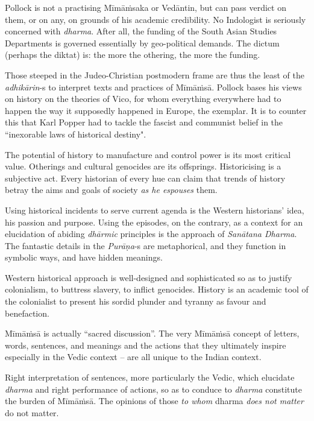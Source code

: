 Pollock is not a practising Mīmāṁsaka or Vedāntin, but can pass verdict on them, or on any, on grounds of his academic credibility. No Indologist is seriously concerned with \textit{dharma}. After all, the funding of the South Asian Studies Departments is governed essentially by geo-political demands. The dictum (perhaps the diktat) is: the more the othering, the more the funding.

 Those steeped in the Judeo-Christian postmodern frame are thus the least of the \textit{adhikārin}-s to interpret texts and practices of Mīmāṁsā. Pollock bases his views on history on the theories of Vico, for whom everything everywhere had to happen the way it supposedly happened in Europe, the exemplar. It is to counter this that Karl Popper had to tackle the fascist and communist belief in the ``inexorable laws of historical destiny".

 The potential of history to manufacture and control power is its most critical value. Otherings and cultural genocides are its offsprings. Historicising is a subjective act. Every historian of every hue can claim that trends of history betray the aims and goals of society \textit{as he espouses} them.

Using historical incidents to serve current agenda is the Western historians’ idea, his passion and purpose. Using the episodes, on the contrary, as a context for an elucidation of abiding \textit{dhārmic} principles is the approach of \textit{Sanātana Dharma}. The fantastic details in the \hbox{\textit{Purāṇa}-s} are metaphorical, and they function in symbolic ways, and have hidden meanings.

Western historical approach is well-designed and sophisticated so as to justify colonialism, to buttress slavery, to inflict genocides. History is an academic tool of the colonialist to present his sordid plunder and tyranny as favour and benefaction.

Mīmāṁsā is actually “sacred discussion”. The very Mīmāṁsā concept of letters, words, sentences, and meanings and the actions that they ultimately inspire especially in the Vedic context – are all unique to the Indian context.

Right interpretation of sentences, more particularly the Vedic, which elucidate \textit{dharma} and right performance of actions, so as to conduce to \textit{dharma} constitute the burden of Mīmāṁsā. The opinions of those \textit{to whom} dharma \textit{does not matter} do not matter.

